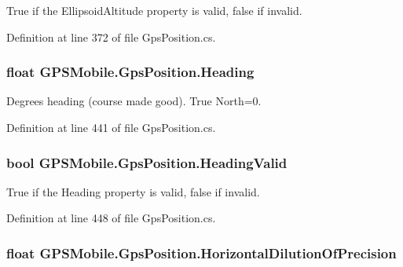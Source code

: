 True if the EllipsoidAltitude property is valid, false if invalid. 

Definition at line 372 of file GpsPosition.cs.\hypertarget{class_g_p_s_mobile_1_1_gps_position_a457add962c7a355c6f72121e274df54b}{
\subsubsection[{Heading}]{\setlength{\rightskip}{0pt plus 5cm}float GPSMobile.GpsPosition.Heading}}
\label{class_g_p_s_mobile_1_1_gps_position_a457add962c7a355c6f72121e274df54b}


Degrees heading (course made good). True North=0. 

Definition at line 441 of file GpsPosition.cs.\hypertarget{class_g_p_s_mobile_1_1_gps_position_ad0c9ecaf766940f752cb27d2e39218c3}{
\subsubsection[{HeadingValid}]{\setlength{\rightskip}{0pt plus 5cm}bool GPSMobile.GpsPosition.HeadingValid}}
\label{class_g_p_s_mobile_1_1_gps_position_ad0c9ecaf766940f752cb27d2e39218c3}


True if the Heading property is valid, false if invalid. 

Definition at line 448 of file GpsPosition.cs.\hypertarget{class_g_p_s_mobile_1_1_gps_position_aaff94d337cfdd281fc058b4bc050b437}{
\subsubsection[{HorizontalDilutionOfPrecision}]{\setlength{\rightskip}{0pt plus 5cm}float GPSMobile.GpsPosition.HorizontalDilutionOfPrecision}}
\label{class_g_p_s_mobile_1_1_gps_position_aaff94d337cfdd281fc058b4bc050b437}


